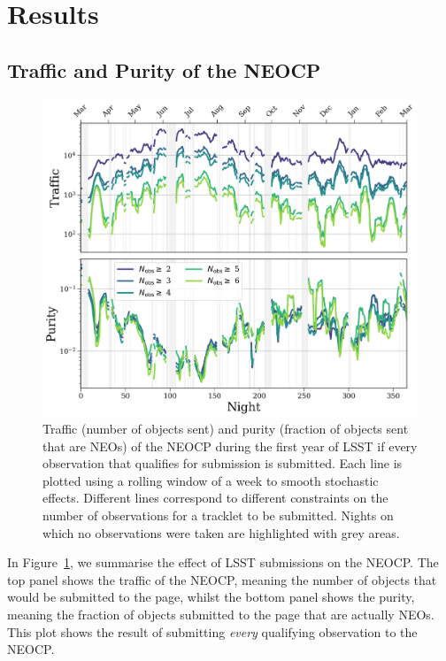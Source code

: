 \documentclass[twocolumn, twocolappendix]{aastex631}
\begin{document}
\section{Results} \label{sec:results}
\subsection{Traffic and Purity of the NEOCP}
\begin{figure}
    \centering
    \includegraphics[width=\textwidth]{traffic_purity.png}
    \caption{Traffic (number of objects sent) and purity (fraction of objects sent that are NEOs) of the NEOCP during the first year of LSST if every observation that qualifies for submission is submitted. Each line is plotted using a rolling window of a week to smooth stochastic effects. Different lines correspond to different constraints on the number of observations for a tracklet to be submitted. Nights on which no observations were taken are highlighted with grey areas.}
    \label{fig:neocp_traffic}
\end{figure}

In Figure~\ref{fig:neocp_traffic}, we summarise the effect of LSST submissions on the NEOCP. The top panel shows the traffic of the NEOCP, meaning the number of objects that would be submitted to the page, whilst the bottom panel shows the purity, meaning the fraction of objects submitted to the page that are actually NEOs. This plot shows the result of submitting \textit{every} qualifying observation to the NEOCP.
\end{document}
